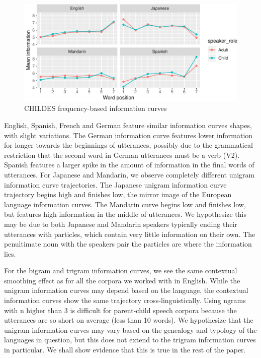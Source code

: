 \documentclass[11pt,]{article}
\begin{document}
\begin{figure}
\centering
\includegraphics{paper_files/figure-latex/unnamed-chunk-4-1.pdf}
\caption{\label{fig:unnamed-chunk-4}CHILDES frequency-based information curves}
\end{figure}

English, Spanish, French and German feature similar information curves shapes, with slight variations. The German information curve features lower information for longer towards the beginnings of utterances, possibly due to the grammatical restriction that the second word in German utterances must be a verb (V2). Spanish features a larger spike in the amount of information in the final words of utterances. For Japanese and Mandarin, we observe completely different unigram information curve trajectories. The Japanese unigram information curve trajectory begins high and finishes low, the mirror image of the European language information curves. The Mandarin curve begins low and finishes low, but features high information in the middle of utterances. We hypothesize this may be due to both Japanese and Mandarin speakers typically ending their utterances with particles, which contain very little information on their own. The penultimate noun with the speakers pair the particles are where the information lies.

For the bigram and trigram information curves, we see the same contextual smoothing effect as for all the corpora we worked with in English. While the unigram information curves may depend based on the language, the contextual information curves show the same trajectory cross-linguistically. Using ngrams with n higher than 3 is difficult for parent-child speech corpora because the utterances are so short on average (less than 10 words). We hypothesize that the unigram information curves may vary based on the genealogy and typology of the languages in question, but this does not extend to the trigram information curves in particular. We shall show evidence that this is true in the rest of the paper.
\end{document}
